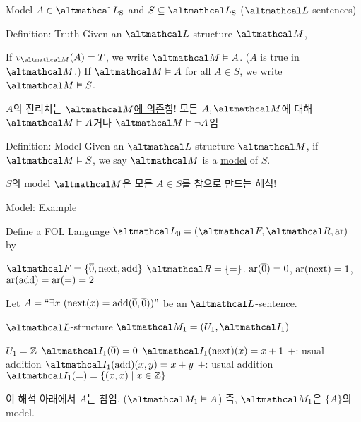 \documentclass[../231120_msquare_computational-logic.tex]{subfiles}
\begin{document}
\begin{frame}{Model}
    \(A \in \LS\) and \(S \subseteq \LS\) (\(\Lang\)-sentences)
    \begin{block}{Definition: Truth}
        Given an \(\Lang\)-structure \(\mcal M\),
        \begin{itemize}
            \ii If \(v_{\mcal M}(A) = T\), we write \(\mcal M \vDash A\). (\(A\) is true in \(\mcal M\).)
            \ii If \(\mcal M \vDash A\) for all \(A \in S\), we write \(\mcal M \vDash S\).
        \end{itemize}
    \end{block}
    \begin{alertblock}{}
        \begin{enumerate}
            \ii \(A\)의 진리치는 \ul{\(\mcal M\)에 의존}함!
            \ii 모든 \(A, \mcal M\)에 대해 \(\mcal M \vDash A\)거나 \(\mcal M \vDash \lnot A\)임
        \end{enumerate}
        
    \end{alertblock} \pause

    \begin{block}{Definition: Model}
        Given an \(\Lang\)-structure \(\mcal M\),
        if \(\mcal M \vDash S\), we say \(\mcal M\) is a \ul{model} of \(S\).
    \end{block}
    \begin{alertblock}{}
        \(S\)의 model \(\mcal M\)은 모든 \(A \in S\)를 참으로 만드는 해석!
    \end{alertblock}
\end{frame}

\begin{frame}{Model: Example}
    \begin{block}{}
        Define a FOL Language \(\Lang_0 = (\mcal F, \mcal R, \mrm{ar})\) by
        \begin{itemize}
            \ii \(\mcal F = \{\ol 0, \mrm{next}, \mrm{add}\}\)
            \ii \(\mcal R = \{=\}\).
            \ii \(\mathrm{ar}(\overline 0) = 0\), \(\mathrm{ar}(\mathrm{next}) = 1\),
                \(\mathrm{ar}(\mathrm{add}) = \mathrm{ar}(=) = 2\)
        \end{itemize}
        Let \(A = ``\exists x\ (\mathrm{next}(x) = \mathrm{add}(\overline 0, \overline 0))"\) be an \(\Lang\)-sentence.
    \end{block} \pause
    \begin{exampleblock}{\(\Lang\)-structure \(\mcal M_1 = (U_1, \mcal I_1)\)}
        \begin{itemize}
            \ii \(U_1 = \mathbb{Z}\)
            \ii \(\mcal I_1(\ol 0) = 0\)
            \ii \(\mcal I_1(\mrm{next})(x) = x + 1\) \hfill{\small \(+\): usual addition}
            \ii \(\mcal I_1(\mrm{add})(x, y) = x + y\) \hfill{\small \(+\): usual addition}
            \ii \(\mcal I_1(=) = \{(x,x) \mid x \in \ZZ\}\)
        \end{itemize}
        이 해석 아래에서 \(A\)는 참임. (\(\mcal M_1 \vDash A\))
        즉, \(\mcal M_1\)은 \(\{A\}\)의 model.
    \end{exampleblock}
\end{frame}
\end{document}
